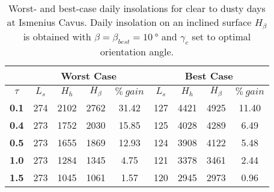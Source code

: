 \begin{table}[h]
\footnotesize
\centering
\caption[Worst- and best-case daily insolations for clear to dusty days at Ismenius Cavus]
{Worst- and best-case daily insolations for clear to dusty days at Ismenius Cavus. Daily insolation on an inclined surface $H_{\beta}$ is obtained with $\beta = \beta_{best} = \SI{10}{\degree}$ and $\gamma_{c}$ set to optimal orientation angle.}
\label{tab:insolation-ismenius-cavus-clear-and-dusty-days}
\begin{tabular}{c|c|c|c|c|c|c|c|c|}
\cline{2-9}
\multicolumn{1}{l|}{} & \multicolumn{4}{c|}{\textbf{Worst Case}} & \multicolumn{4}{c|}{\textbf{Best Case}} \\ \hline
\multicolumn{1}{|c|}{$\tau$} & $L_{s}$ & $H_{h}$ & $H_{\beta}$ & $\%\:gain$ & $L_{s}$ & $H_{h}$ & $H_{\beta}$ & $\%\:gain$ \\ \hline
\multicolumn{1}{|c|}{\textbf{0.1}} & 274 & 2102 & 2762 & 31.42 & 127 & 4421 & 4925 & 11.40 \\ \hline
\multicolumn{1}{|c|}{\textbf{0.4}} & 273 & 1752 & 2030 & 15.85 & 125 & 4028 & 4289 & 6.49 \\ \hline
\multicolumn{1}{|c|}{\textbf{0.5}} & 273 & 1655 & 1869 & 12.93 & 124 & 3908 & 4122 & 5.48 \\ \hline
\multicolumn{1}{|c|}{\textbf{1.0}} & 273 & 1284 & 1345 & 4.75 & 121 & 3378 & 3461 & 2.44 \\ \hline
\multicolumn{1}{|c|}{\textbf{1.5}} & 273 & 1045 & 1061 & 1.57 & 120 & 2945 & 2973 & 0.96 \\ \hline
\end{tabular}
\end{table}
